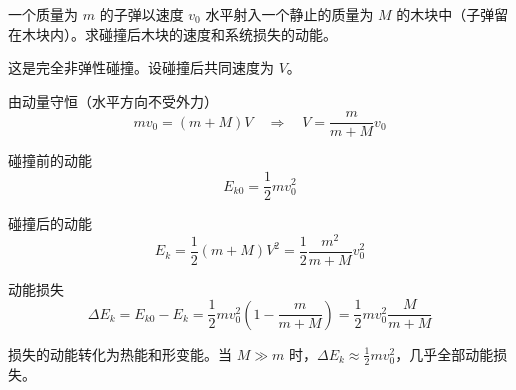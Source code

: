 \begin{example}
    一个质量为 $m$ 的子弹以速度 $v_0$ 水平射入一个静止的质量为 $M$ 的木块中（子弹留在木块内）。求碰撞后木块的速度和系统损失的动能。
    \begin{solution}
        这是完全非弹性碰撞。设碰撞后共同速度为 $V$。
        
        由动量守恒（水平方向不受外力）
        \begin{equation}
            mv_0 = (m + M)V \quad \Longrightarrow \quad V = \frac{m}{m + M}v_0
        \end{equation}
        
        碰撞前的动能
        \begin{equation}
            E_{k0} = \frac{1}{2}mv_0^2
        \end{equation}
        
        碰撞后的动能
        \begin{equation}
            E_k = \frac{1}{2}(m + M)V^2 = \frac{1}{2}\frac{m^2}{m + M}v_0^2
        \end{equation}
        
        动能损失
        \begin{equation}
            \Delta E_k = E_{k0} - E_k = \frac{1}{2}mv_0^2\left(1 - \frac{m}{m + M}\right) = \frac{1}{2}mv_0^2\frac{M}{m + M}
        \end{equation}
        
        损失的动能转化为热能和形变能。当 $M \gg m$ 时，$\Delta E_k \approx \frac{1}{2}mv_0^2$，几乎全部动能损失。
    \end{solution}
\end{example}

